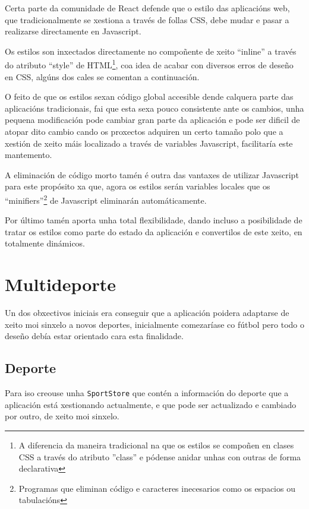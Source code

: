     Certa parte da comunidade de React defende que o estilo das aplicacións 
web, que tradicionalmente se xestiona a través de follas CSS, debe mudar e 
pasar a realizarse directamente en Javascript.

    Os estilos son inxectados directamente no compoñente de xeito ``inline'' a 
través do atributo ``style'' de HTML\footnote{A diferencia da maneira 
tradicional na que os estilos se compoñen en clases CSS a través do atributo 
''class'' e pódense anidar unhas con outras de forma declarativa}, coa idea de 
acabar con diversos erros de deseño en CSS, algúns dos cales se comentan a 
continuación.

    O feito de que os estilos sexan código global accesible dende calquera 
parte das aplicacións tradicionais, fai que esta sexa pouco consistente ante os 
cambios, unha pequena modificación pode cambiar gran parte da aplicación e pode 
ser dificil de atopar dito cambio cando os proxectos adquiren un certo 
tamaño polo que a xestión de xeito máis localizado a través de variables 
Javascript, facilitaría este mantemento.

    A eliminación de código morto tamén é outra das vantaxes de utilizar 
Javascript para este propósito xa que, agora os estilos serán variables locales 
que os ``minifiers''\footnote{Programas que eliminan código e 
caracteres inecesarios como os espacios ou tabulacións} de Javascript 
eliminarán automáticamente.

    Por último tamén aporta unha total flexibilidade, dando incluso a 
posibilidade de tratar os estilos como parte do estado da aplicación e 
convertilos de este xeito, en totalmente dinámicos.

  \section{Multideporte}
  Un dos obxectivos iniciais era conseguir que a aplicación poidera adaptarse 
de xeito moi sinxelo a novos deportes, inicialmente comezaríase co fútbol pero 
todo o deseño debía estar orientado cara esta finalidade.

  \subsection{Deporte}
  Para iso creouse unha \lstinline{SportStore} que contén a información do 
deporte 
que a aplicación está xestionando actualmente, e que pode ser actualizado e 
cambiado por outro, de xeito moi sinxelo.

